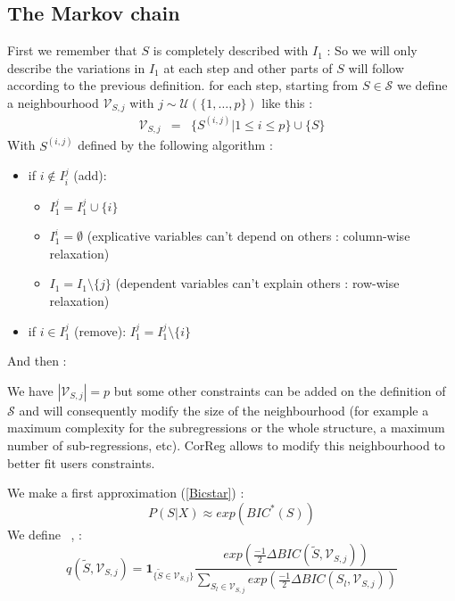 \documentclass[12pt]{article}
\begin{document}
	\subsection{The Markov chain}
	First we remember that $S$ is completely described with $I_1$ :
	So we will only describe the variations in $I_1$ at each step and other parts of $S$ will follow according to the previous definition.
	for each step, starting from $S \in \mathcal{S}$ we define a neighbourhood $\mathcal{V}_{S,j}$ with $j \sim \mathcal{U}(\{1,\dots,p\}) $ like this  :	
	\begin{eqnarray}
		\mathcal{V}_{S,j}&=&\{ S^{(i,j)} | 1\leq i\leq p \} \cup\{S \}
	\end{eqnarray}	
	With $S^{(i,j)}$ defined by the following algorithm :
	\begin{itemize}
		\item if $i \notin I_i^j$ (add): 
			\begin{itemize}
				\item $I_1^j=I_1^j\cup \{i\}$
				\item $I_1^i=\emptyset$ (explicative variables can't depend on others : column-wise relaxation)
				\item $I_1=I_1 \setminus \{j\}$ (dependent variables can't explain others : row-wise relaxation) 
			\end{itemize}			 
		\item if $i \in I_1^j$ (remove): $I_1^j=I_1^j\setminus \{i\}$
	\end{itemize}
	And then :
	
	We have $|\mathcal{V}_{S,j}|=p$ but some other constraints can be added on the definition of $\mathcal{S}$ and will consequently modify the size of the neighbourhood (for example a maximum complexity for the subregressions or the whole structure, a maximum number of sub-regressions, etc). CorReg allows to modify this neighbourhood to better fit users constraints. 
	
		
	We make a first approximation (\ref{Bicstar}) : 
	\begin{equation}
		P(S|X)\approx exp(BIC^*(S))
	\end{equation}
	We define ~\cite{BIChuard}, :
	\begin{equation}
		q(\tilde{S},\mathcal{V}_{S,j})=\mathbf{1}_{ \{\tilde{S}\in \mathcal{V}_{S,j}\} }\frac{exp(\frac{-1}{2}\Delta BIC(\tilde{S},\mathcal{V}_{S,j}))}{\sum_{S_l\in \mathcal{V}_{S,j}}exp(\frac{-1}{2}\Delta BIC(S_l,\mathcal{V}_{S,j}))}
	\end{equation}
	
\end{document}
